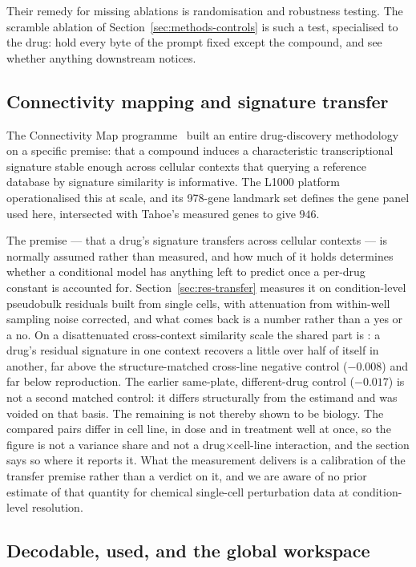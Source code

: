 Their remedy for missing ablations is randomisation and robustness testing. The scramble ablation of
Section~\ref{sec:methods-controls} is such a test, specialised to the drug: hold every byte of the
prompt fixed except the compound, and see whether anything downstream notices.

\subsection{Connectivity mapping and signature transfer}

The Connectivity Map programme~\cite{cmap,l1000} built an entire drug-discovery methodology on a
specific premise: that a compound induces a characteristic transcriptional signature stable enough
across cellular contexts that querying a reference database by signature similarity is informative.
The L1000 platform~\cite{l1000} operationalised this at scale, and its 978-gene landmark set defines
the gene panel used here, intersected with Tahoe's measured genes to give $946$.

The premise --- that a drug's signature transfers across cellular contexts --- is normally assumed
rather than measured, and how much of it holds determines whether a conditional model has anything
left to predict once a per-drug constant is accounted for. Section~\ref{sec:res-transfer} measures
it on condition-level pseudobulk residuals built from single cells, with attenuation from within-well
sampling noise corrected, and what comes back is a number rather than a yes or a no. On a
disattenuated cross-context similarity scale the
shared part is : a drug's residual signature in one context
recovers a little over half of itself in another, far above the structure-matched cross-line
negative control ($-0.008$) and far below reproduction. The earlier same-plate, different-drug
control ($-0.017$) is not a second matched control: it differs structurally from the estimand and was
voided on that basis. The remaining  is not thereby shown to be biology.
The compared pairs differ in cell line, in dose and in treatment well at once, so the figure is not
a variance share and not a drug$\times$cell-line interaction, and the section says so where it
reports it. What the measurement delivers is a calibration of the transfer premise rather than a
verdict on it, and we are aware of no prior estimate of that quantity for chemical single-cell
perturbation data at condition-level resolution.

\subsection{Decodable, used, and the global workspace}
\label{sec:lit-interp}

